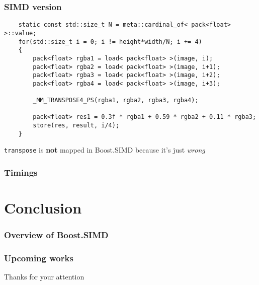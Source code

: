 \documentclass{beamer}
\begin{document}
\begin{frame}[fragile]
	\frametitle{SIMD version}
	
	\begin{lstlisting}
	static const std::size_t N = meta::cardinal_of< pack<float> >::value;
	for(std::size_t i = 0; i != height*width/N; i += 4)
	{
	    pack<float> rgba1 = load< pack<float> >(image, i);
	    pack<float> rgba2 = load< pack<float> >(image, i+1);
	    pack<float> rgba3 = load< pack<float> >(image, i+2);
	    pack<float> rgba4 = load< pack<float> >(image, i+3);
	    
	    _MM_TRANSPOSE4_PS(rgba1, rgba2, rgba3, rgba4);		
	    
	    pack<float> res1 = 0.3f * rgba1 + 0.59 * rgba2 + 0.11 * rgba3;
	    store(res, result, i/4); 
	}
	\end{lstlisting}
	\bigskip
	
	\lstinline{transpose} is \textbf{not} mapped in Boost.SIMD because it's just \textit{wrong}
\end{frame}

\begin{frame}
	\frametitle{Timings}
	
	
\end{frame}

\section{Conclusion}
\frame
{
  \frametitle{Overview of Boost.SIMD}
}

\frame
{
  \frametitle{Upcoming works}
}

\frame
{
\begin{center}\Huge Thanks for your attention\end{center}
}
\end{document}
